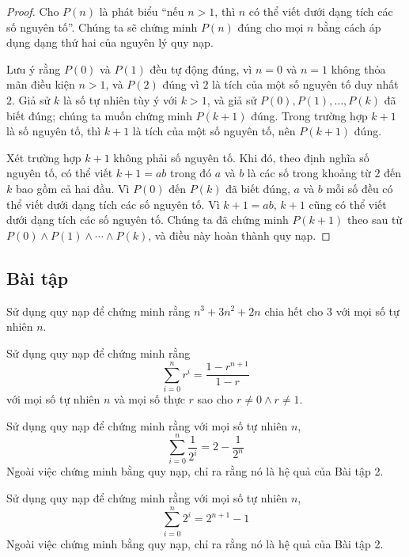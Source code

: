 \begin{proof}
Cho $P(n)$ là phát biểu ``nếu $n > 1$, thì $n$ có thể viết dưới dạng tích các số nguyên tố''. Chúng ta sẽ chứng minh $P(n)$ đúng cho mọi $n$ bằng cách áp dụng dạng thứ hai của nguyên lý quy nạp.

Lưu ý rằng $P(0)$ và $P(1)$ đều tự động đúng, vì $n = 0$ và $n = 1$ không thỏa mãn điều kiện $n > 1$, và $P(2)$ đúng vì $2$ là tích của một số nguyên tố duy nhất $2$. Giả sử $k$ là số tự nhiên tùy ý với $k > 1$, và giả sử $P(0), P(1), \ldots, P(k)$ đã biết đúng; chúng ta muốn chứng minh $P(k+1)$ đúng. Trong trường hợp $k + 1$ là số nguyên tố, thì $k + 1$ là tích của một số nguyên tố, nên $P(k+1)$ đúng.

Xét trường hợp $k + 1$ không phải số nguyên tố. Khi đó, theo định nghĩa số nguyên tố, có thể viết $k + 1 = ab$ trong đó $a$ và $b$ là các số trong khoảng từ $2$ đến $k$ bao gồm cả hai đầu. Vì $P(0)$ đến $P(k)$ đã biết đúng, $a$ và $b$ mỗi số đều có thể viết dưới dạng tích các số nguyên tố. Vì $k + 1 = ab$, $k + 1$ cũng có thể viết dưới dạng tích các số nguyên tố. Chúng ta đã chứng minh $P(k+1)$ theo sau từ $P(0) \wedge P(1) \wedge \cdots \wedge P(k)$, và điều này hoàn thành quy nạp.
\end{proof}

\subsection*{Bài tập}
\begin{exercise}
Sử dụng quy nạp để chứng minh rằng $n^3 + 3n^2 + 2n$ chia hết cho $3$ với mọi số tự nhiên $n$.
\end{exercise}

\begin{exercise}
Sử dụng quy nạp để chứng minh rằng
\[\sum_{i=0}^{n} r^i = \frac{1 - r^{n+1}}{1 - r}\]
với mọi số tự nhiên $n$ và mọi số thực $r$ sao cho $r \neq 0 \wedge r \neq 1$.
\end{exercise}

\begin{exercise}
Sử dụng quy nạp để chứng minh rằng với mọi số tự nhiên $n$,
\[\sum_{i=0}^{n} \frac{1}{2^i} = 2 - \frac{1}{2^n}\]
Ngoài việc chứng minh bằng quy nạp, chỉ ra rằng nó là hệ quả của Bài tập 2.
\end{exercise}

\begin{exercise}
Sử dụng quy nạp để chứng minh rằng với mọi số tự nhiên $n$,
\[\sum_{i=0}^{n} 2^i = 2^{n+1} - 1\]
Ngoài việc chứng minh bằng quy nạp, chỉ ra rằng nó là hệ quả của Bài tập 2.
\end{exercise}

